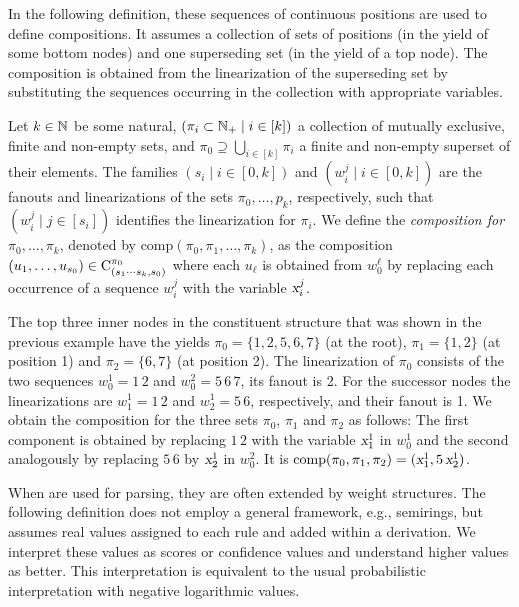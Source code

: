 \documentclass[../../document.tex]{subfiles}
\begin{document}
    In the following definition, these sequences of continuous positions are used to define  compositions.
    It assumes a collection of sets of positions (in the yield of some bottom nodes) and one superseding set (in the yield of a top node).
    The composition is obtained from the linearization of the superseding set by substituting the sequences occurring in the collection with appropriate variables.

    \begin{definition}
        Let \(k \in \mathbb{N}\) be some natural, \((\pi_i \subset \mathbb{N}_+ \mid i \in [k])\) a collection of mutually exclusive, finite and non-empty sets, and \(\pi_0 \supseteq \bigcup_{i \in [k]} \pi_i\) a finite and non-empty superset of their elements.
        The families \((s_i \mid i \in [0,k])\) and \((w_i^j \mid i \in [0,k])\) are the fanouts and linearizations of the sets \(\pi_0, \ldots, p_k\), respectively, such that \((w_i^j \mid j \in [s_i])\) identifies the linearization for \(\pi_i\).
        We define the \emph{composition for \(\pi_0, \ldots, \pi_k\)}, denoted by \(\mathrm{comp}(\pi_0, \pi_1, \ldots, \pi_k)\), as the composition \((u_1, \ldots, u_{s_0}) \in \mathrm{C}^{\pi_0}_{(s_1\cdots s_k, s_0)}\) where each \(u_\ell\) is obtained from \(w_0^\ell\) by replacing each occurrence of a sequence \(w_i^j\) with the variable \(\textsl{x}_i^j\).
    \end{definition}

    \begin{example}
        The top three inner nodes in the constituent structure that was shown in the previous example have the yields \(\pi_0 = \{1,2,5,6,7\}\) (at the root), \(\pi_1 = \{1,2\}\) (at position 1) and \(\pi_2 = \{6,7\}\) (at position 2).
        The linearization of \(\pi_0\) consists of the two sequences \(w_0^1 = 1\,2\) and \(w_0^2 = 5\,6\,7\), its fanout is 2.
        For the successor nodes the linearizations are \(w_1^1 = 1\,2\) and \(w_2^1 = 5\,6\), respectively, and their fanout is 1.
        We obtain the composition for the three sets \(\pi_0\), \(\pi_1\) and \(\pi_2\) as follows:
            The first component is obtained by replacing \(1\,2\) with the variable \(\textsl{x}_1^1\) in \(w_0^1\) and the second analogously by replacing \(5\,6\) by \(\textsl{x}_2^1\) in \(w_0^2\).
        It is \(\mathrm{comp}(\pi_0, \pi_1, \pi_2) = (\textsl{x}_1^1, 5\,\textsl{x}_2^1)\).
    \end{example}

    When  are used for parsing, they are often extended by weight structures.
    The following definition does not employ a general framework, e.g.\@, semirings, but assumes real values assigned to each rule and added within a derivation.
    We interpret these values as scores or confidence values and understand higher values as better.
    This interpretation is equivalent to the usual probabilistic interpretation \citep[cf.][Viterbi semiring]{Goodman} with negative logarithmic values.
\end{document}
